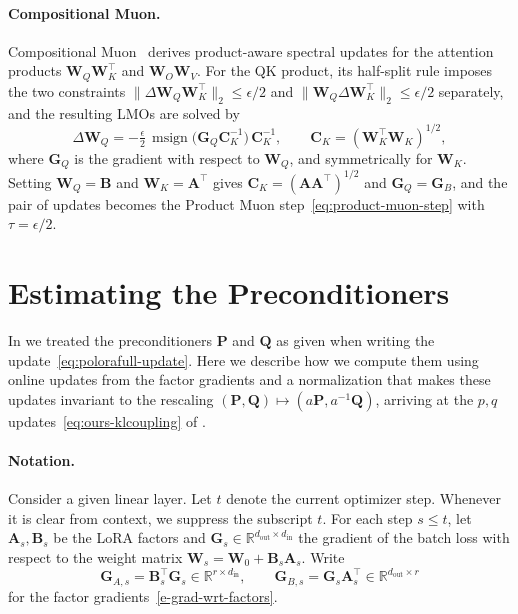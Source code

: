 \documentclass{article}
\newcommand{\mat}[1]{\bm{#1}}
\newcommand{\R}{\mathbb{R}}
\DeclareMathOperator{\msign}{msign}          %
\newcommand{\norm}[1]{\| #1\|}
\begin{document}
\paragraph{Compositional Muon.}
Compositional Muon~\cite{tilde_csd} derives product-aware spectral updates for the attention products $\mat{W}_Q\mat{W}_K^\top$ and $\mat{W}_O\mat{W}_V$. For the QK product, its half-split rule imposes the two constraints $\norm{\Delta\mat{W}_Q \mat{W}_K^\top}_2\le\epsilon/2$ and $\norm{\mat{W}_Q\Delta\mat{W}_K^\top}_2\le\epsilon/2$ separately, and the resulting LMOs are solved by
\[
  \Delta\mat{W}_Q=-\tfrac{\epsilon}{2}\,\msign\!\big(\mat{G}_Q \mat{C}_K^{-1}\big)\,\mat{C}_K^{-1},
  \qquad \mat{C}_K=(\mat{W}_K^\top \mat{W}_K)^{1/2},
\]
where $\mat{G}_Q$ is the gradient with respect to $\mat{W}_Q$, and symmetrically for $\mat{W}_K$. Setting $\mat{W}_Q=\mat{B}$ and $\mat{W}_K=\mat{A}^\top$ gives $\mat{C}_K=(\mat{A}\mat{A}^\top)^{1/2}$ and $\mat{G}_Q=\mat{G}_B$, and the pair of updates becomes the Product Muon step~\eqref{eq:product-muon-step} with $\tau=\epsilon/2$.



\section{Estimating the Preconditioners}
\label{app:matnormal}
In  we treated the preconditioners $\mat{P}$ and $\mat{Q}$ as given when writing the update~\eqref{eq:polorafull-update}. Here we describe how we compute them using online updates from the factor gradients and a normalization that makes these updates invariant to the rescaling $(\mat{P},\mat{Q})\mapsto(a\mat{P},a^{-1}\mat{Q})$, arriving at the $p,q$ updates~\eqref{eq:ours-klcoupling} of .

\paragraph{Notation.} Consider a given linear layer. Let $t$ denote the current optimizer step. Whenever it is clear from context, we suppress the subscript $t$. For each step $s\le t$,
let $\mat{A}_s,\mat{B}_s$ be the LoRA factors and
$\mat{G}_s\in\R^{d_{\mathrm{out}}\times d_{\mathrm{in}}}$ the gradient of the batch loss with respect to the weight matrix $\mat{W}_s=\mat{W}_0+\mat{B}_s\mat{A}_s$. Write
\begin{equation} \label{eq:chain-rule}
  \mat{G}_{A,s}=\mat{B}_s^\top \mat{G}_s\in\R^{r\times d_{\mathrm{in}}},\qquad
  \mat{G}_{B,s}=\mat{G}_s\mat{A}_s^\top\in\R^{d_{\mathrm{out}}\times r}
\end{equation}
for the factor
gradients~\eqref{e-grad-wrt-factors}.
\end{document}
